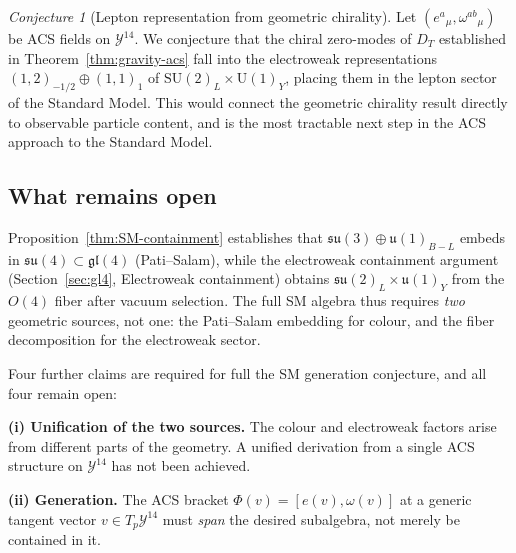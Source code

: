 \documentclass[11pt,a4paper]{article}
\theoremstyle{plain}
\theoremstyle{definition}
\theoremstyle{remark}
\newtheorem{conjecture}[theorem]{Conjecture}
\begin{document}
\begin{conjecture}[Lepton representation from geometric chirality]
\label{conj:lepton}
Let $(e^a{}_\mu, \omega^{ab}{}_\mu)$ be ACS fields on $\mathcal{Y}^{14}$.
We conjecture that the chiral zero-modes of $D_T$ established in
Theorem~\ref{thm:gravity-acs} fall into the electroweak representations
$(1,2)_{-1/2} \oplus (1,1)_1$ of $\mathrm{SU}(2)_L \times \mathrm{U}(1)_Y$,
placing them in the lepton sector of the Standard Model.
This would connect the geometric chirality result directly to
observable particle content, and is the most tractable next step
in the ACS approach to the Standard Model.
\end{conjecture}

\subsection{What remains open}

Proposition~\ref{thm:SM-containment} establishes that $\mathfrak{su}(3) \oplus \mathfrak{u}(1)_{B-L}$
embeds in $\mathfrak{su}(4) \subset \mathfrak{gl}(4)$ (Pati--Salam), while the electroweak 
containment argument (Section~\ref{sec:gl4}, Electroweak containment) obtains 
$\mathfrak{su}(2)_L \times \mathfrak{u}(1)_Y$ from the $O(4)$ fiber after vacuum selection.
The full SM algebra thus requires \emph{two} geometric sources, not one:
the Pati--Salam embedding for colour, and the fiber decomposition for the electroweak sector.

Four further claims are required for full 
the SM generation conjecture, and all four remain open:

\medskip
\noindent\textbf{(i) Unification of the two sources.}
The colour and electroweak factors arise from different parts of the geometry.
A unified derivation from a single ACS structure on $\mathcal{Y}^{14}$ has not been achieved.

\medskip
\noindent\textbf{(ii) Generation.}  
The ACS bracket $\Phi(v) = [e(v), \omega(v)]$ at a generic tangent vector 
$v \in T_p\mathcal{Y}^{14}$ must \emph{span} the desired subalgebra, 
not merely be contained in it.
\end{document}
